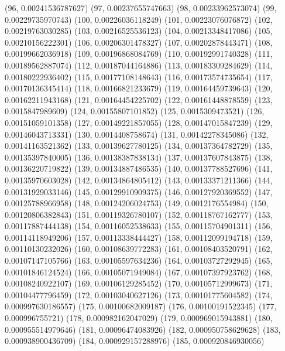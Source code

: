 {					(96, 0.00241536787627)
					(97, 0.00237655747663)
					(98, 0.00233962573074)
					(99, 0.00229735970743)
					(100, 0.00226036118249)
					(101, 0.00223076076872)
					(102, 0.00219763030285)
					(103, 0.00216525536123)
					(104, 0.00213348417086)
					(105, 0.00210156222301)
					(106, 0.00206301478327)
					(107, 0.00202878443471)
					(108, 0.00199662036918)
					(109, 0.00196868084769)
					(110, 0.00192991740328)
					(111, 0.00189562887074)
					(112, 0.00187044164886)
					(113, 0.00183309284629)
					(114, 0.00180222936402)
					(115, 0.00177108148643)
					(116, 0.00173574735654)
					(117, 0.00170136345414)
					(118, 0.00166821233679)
					(119, 0.00164459739643)
					(120, 0.00162211943168)
					(121, 0.00164454225702)
					(122, 0.00161448878559)
					(123, 0.0015847989609)
					(124, 0.00155807101852)
					(125, 0.0015309473521)
					(126, 0.00151059101358)
					(127, 0.00149221857055)
					(128, 0.00147015847239)
					(129, 0.00146043713331)
					(130, 0.0014408758674)
					(131, 0.00142278345086)
					(132, 0.00141163521362)
					(133, 0.00139627780125)
					(134, 0.00137364782729)
					(135, 0.00135397840005)
					(136, 0.00138387838134)
					(137, 0.00137607843875)
					(138, 0.00136220719822)
					(139, 0.00134887486535)
					(140, 0.00137788527696)
					(141, 0.00135970603028)
					(142, 0.00134864805412)
					(143, 0.00133371211366)
					(144, 0.00131929033146)
					(145, 0.00129910909375)
					(146, 0.00127920369552)
					(147, 0.00125788966958)
					(148, 0.00124206024753)
					(149, 0.0012176554984)
					(150, 0.00120806382843)
					(151, 0.00119326780107)
					(152, 0.00118767162777)
					(153, 0.00117887444138)
					(154, 0.00116052538633)
					(155, 0.00115704901311)
					(156, 0.00114118949206)
					(157, 0.00113338444427)
					(158, 0.00112099194718)
					(159, 0.00110130232026)
					(160, 0.00108639772283)
					(161, 0.00108403520791)
					(162, 0.00107147105766)
					(163, 0.00105597634236)
					(164, 0.00103727292945)
					(165, 0.00101846124524)
					(166, 0.00105071949084)
					(167, 0.00107397923762)
					(168, 0.00108240922107)
					(169, 0.00106129285452)
					(170, 0.00105712999673)
					(171, 0.00104477796459)
					(172, 0.00103040627126)
					(173, 0.00101775604582)
					(174, 0.000997630186557)
					(175, 0.00100682009187)
					(176, 0.00100191522345)
					(177, 0.000996755721)
					(178, 0.000982162047029)
					(179, 0.000969015943881)
					(180, 0.000955514979646)
					(181, 0.00096474083926)
					(182, 0.000950758629628)
					(183, 0.000938900436709)
					(184, 0.000929157288976)
					(185, 0.000920846930056)
}
